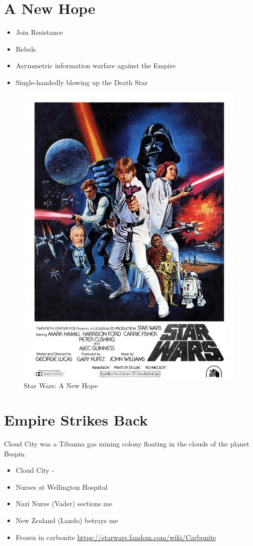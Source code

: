 \documentclass[16pt,openany,oneside]{book}
\begin{document}
\chapter{A New Hope}

\begin{itemize}
    \item Join Resistance 
    \item Rebels
    \item Asymmetric information warfare against the Empire
    \item Single-handedly blowing up the Death Star
\end{itemize}

\begin{figure}[H]
    \centering
    \includegraphics[width=0.5\linewidth]{assets/star_wars/a_new_hope.jpg}
    \caption{Star Wars: A New Hope}
    \label{fig:a-new-hope-poster}
\end{figure}

\chapter{Empire Strikes Back}

Cloud City was a Tibanna gas mining colony floating in the clouds of the planet Bespin.

\begin{itemize}
    \item Cloud City - 
    \item Nurses at Wellington Hospital
    \item Nazi Nurse (Vader) sections me 
    \item New Zealand (Lando) betrays me
    \item Frozen in carbonite 
    \url{https://starwars.fandom.com/wiki/Carbonite}
\end{itemize}
\end{document}
